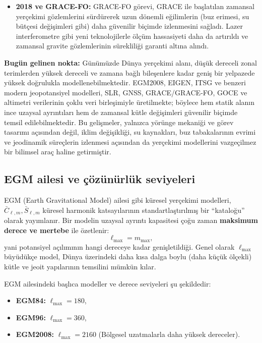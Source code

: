 \begin{itemize}
\item \textbf{2018 ve GRACE-FO:}
GRACE-FO görevi, GRACE ile başlatılan zamansal yerçekimi gözlemlerini sürdürerek uzun dönemli eğilimlerin (buz erimesi, su bütçesi değişimleri gibi) daha güvenilir biçimde izlenmesini sağladı. Lazer interferometre gibi yeni teknolojilerle ölçüm hassasiyeti daha da artırıldı ve zamansal gravite gözlemlerinin sürekliliği garanti altına alındı.
\end{itemize}

\medskip
\noindent
\textbf{Bugün gelinen nokta:}
Günümüzde Dünya yerçekimi alanı, düşük dereceli zonal terimlerden
yüksek dereceli ve zamana bağlı bileşenlere kadar geniş bir yelpazede yüksek doğrulukla modellenebilmektedir. EGM2008, EIGEN, ITSG ve benzeri modern jeopotansiyel modelleri, SLR, GNSS, GRACE/GRACE-FO, GOCE ve altimetri verilerinin çoklu veri birleşimiyle üretilmekte; böylece hem statik alanın ince
uzaysal ayrıntıları hem de zamansal kütle değişimleri güvenilir biçimde temsil edilebilmektedir. Bu gelişmeler, yalnızca yörünge mekaniği ve görev tasarımı açısından değil, iklim değişikliği, su kaynakları, buz tabakalarının evrimi ve jeodinamik süreçlerin izlenmesi açısından da yerçekimi modellerini vazgeçilmez
bir bilimsel araç haline getirmiştir.

\subsection*{EGM ailesi ve çözünürlük seviyeleri}
\label{subsec:EGM_family}

EGM (Earth Gravitational Model) ailesi gibi küresel yerçekimi modelleri,
$\bar C_{\ell, m}, \bar S_{\ell, m}$ küresel harmonik katsayılarının standartlaştırılmış bir ``kataloğu'' olarak yayımlanır. Bir modelin uzaysal ayrıntı kapasitesi çoğu zaman
\textbf{maksimum derece ve mertebe} ile özetlenir:
\[
\ell_{\max} = m_{\max},
\]
yani potansiyel açılımının hangi dereceye kadar genişletildiği.
Genel olarak $\ell_{\max}$ büyüdükçe model,
Dünya üzerindeki daha kısa dalga boylu (daha küçük ölçekli)
kütle ve jeoit yapılarının temsilini mümkün kılar.

EGM ailesindeki başlıca modeller ve derece seviyeleri şu şekildedir:
\begin{itemize}
\item \textbf{EGM84:} $\ell_{\max}=180$,
\item \textbf{EGM96:} $\ell_{\max}=360$,
\item \textbf{EGM2008:} $\ell_{\max}=2160$
(Bölgesel uzatmalarla daha yüksek dereceler).
\end{itemize}


